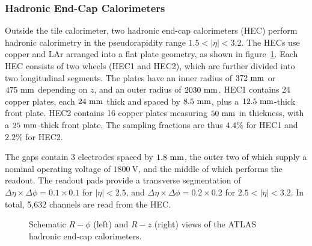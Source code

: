 \subsubsection{Hadronic End-Cap Calorimeters}\label{sec:ATLAS-calorimeters-HEC}
Outside the tile calorimeter, two hadronic end-cap calorimeters (HEC) perform hadronic calorimetry in the pseudorapidity range $1.5<|\eta|<3.2$. The HECs use copper and LAr arranged into a flat plate geometry, as shown in figure~\ref{fig:ATLAS-calorimeters-HEC-layout}. Each HEC consists of two wheels (HEC1 and HEC2), which are further divided into two longitudinal segments.  The plates have an inner radius of $372~\mathrm{mm}$ or $475~\mathrm{mm}$ depending on $z$, and an outer radius of $2030~\mathrm{mm}$. HEC1 contains 24 copper plates, each $24~\mathrm{mm}$ thick and spaced by $8.5~\mathrm{mm}$, plus a $12.5~\mathrm{mm}$-thick front plate. HEC2 contains 16 copper plates measuring $50~\mathrm{mm}$ in thickness, with a $25~\mathrm{mm}$-thick front plate. The sampling fractions are thus $4.4\%$ for HEC1 and $2.2\%$ for HEC2. 

The gaps contain 3 electrodes spaced by $1.8~\mathrm{mm}$, the outer two of which supply a nominal operating voltage of $1800~\mbox{V}$, and the middle of which performs the readout. The readout pads provide a transverse segmentation of $\Delta\eta\times\Delta\phi=0.1\times0.1$ for $|\eta|<2.5$, and $\Delta\eta\times\Delta\phi=0.2\times0.2$ for $2.5<|\eta|<3.2$. In total, 5,632 channels are read from the HEC. 

\begin{figure}[htbp]
	\centering
	\caption{Schematic $R-\phi$ (left) and $R-z$ (right) views of the ATLAS hadronic end-cap calorimeters.}
	\label{fig:ATLAS-calorimeters-HEC-layout}
\end{figure}


